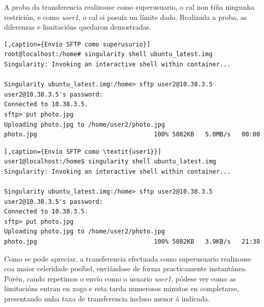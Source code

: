 A proba da transferencia realizouse como superusuario, o cal non tiña ningunha restrición, e como \textit{user1}, o cal si posuía un límite dado. Realizada a proba, as diferenzas e limitacións quedaron demostradas.

\begin{lstlisting}[,caption={Envío SFTP como superusurio}]
root@localhost:/home# singularity shell ubuntu_latest.img 
Singularity: Invoking an interactive shell within container...

Singularity ubuntu_latest.img:/home> sftp user2@10.38.3.5
user2@10.38.3.5's password: 
Connected to 10.38.3.5.
sftp> put photo.jpg 
Uploading photo.jpg to /home/user2/photo.jpg
photo.jpg                                100% 5082KB   5.0MB/s   00:00    
\end{lstlisting}

\begin{lstlisting}[,caption={Envío SFTP como \textit{user1}}]
user1@localhost:/home$ singularity shell ubuntu_latest.img
Singularity: Invoking an interactive shell within container...

Singularity ubuntu_latest.img:/home> sftp user2@10.38.3.5
user2@10.38.3.5's password: 
Connected to 10.38.3.5.
sftp> put photo.jpg 
Uploading photo.jpg to /home/user2/photo.jpg
photo.jpg                                100% 5082KB   3.9KB/s   21:38
\end{lstlisting}

Como se pode apreciar, a transferencia efectuada como superusuario realizouse coa maior celeridade posíbel, enviándose de forma practicamente instantánea. Porén, cando repetimos o envío como o usuario \textit{user1}, pódese ver como as limitacións entran en xogo e esta tarda numerosos minutos en completarse, presentando unha taxa de transferencia incluso menor á indicada.
